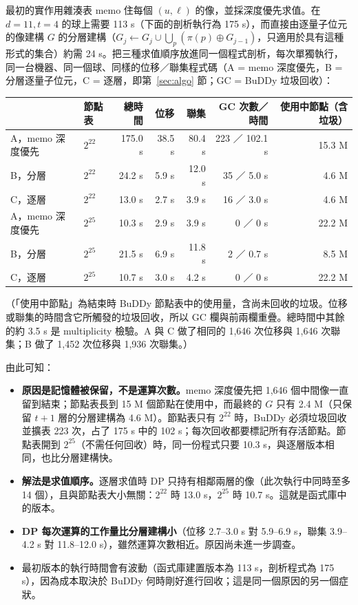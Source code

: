 \documentclass[a4paper,11pt,fontset=none]{ctexart}
\theoremstyle{definition}
\begin{document}
最初的實作用雜湊表 memo 住每個 $(u,\ell)$ 的像，並採深度優先求值。在 $d{=}11,t{=}4$ 的球上需要 113 s（下面的剖析執行為 175 s），而直接由逐量子位元的像建構 $G$ 的分層建構（$G_j\leftarrow G_j\cup\bigcup_p(\pi(p)\oplus G_{j-1})$，只適用於具有這種形式的集合）約需 24 s。把三種求值順序放進同一個程式剖析，每次單獨執行，同一台機器、同一個球、同樣的位移／聯集程式碼（A = memo 深度優先，B = 分層逐量子位元，C = 逐層，即第~\ref{sec:algo} 節；GC = BuDDy 垃圾回收）：
\begin{center}
\small
\begin{tabular}{@{}llrrrrr@{}}
\toprule
 & 節點表 & 總時間 & 位移 & 聯集 & GC 次數／時間 & 使用中節點（含垃圾）\\
\midrule
A，memo 深度優先 & $2^{22}$ & 175.0 s & 38.5 s & 80.4 s & 223 ／ 102.1 s & 15.3 M\\
B，分層 & $2^{22}$ & 24.2 s & 5.9 s & 12.0 s & 35 ／ 5.0 s & 4.6 M\\
C，逐層 & $2^{22}$ & 13.0 s & 2.7 s & 3.9 s & 16 ／ 3.0 s & 4.6 M\\
A，memo 深度優先 & $2^{25}$ & 10.3 s & 2.9 s & 3.9 s & 0 ／ 0 s & 22.2 M\\
B，分層 & $2^{25}$ & 21.5 s & 6.9 s & 11.8 s & 2 ／ 0.7 s & 8.5 M\\
C，逐層 & $2^{25}$ & 10.7 s & 3.0 s & 4.2 s & 0 ／ 0 s & 22.2 M\\
\bottomrule
\end{tabular}
\end{center}
（「使用中節點」為結束時 BuDDy 節點表中的使用量，含尚未回收的垃圾。位移或聯集的時間含它所觸發的垃圾回收，所以 GC 欄與前兩欄重疊。總時間中其餘的約 3.5 s 是 multiplicity 檢驗。A 與 C 做了相同的 1,646 次位移與 1,646 次聯集；B 做了 1,452 次位移與 1,936 次聯集。）

由此可知：
\begin{itemize}[leftmargin=1.5em]
\item \textbf{原因是記憶體被保留，不是運算次數。}memo 深度優先把 1,646 個中間像一直留到結束；節點表長到 15 M 個節點在使用中，而最終的 $G$ 只有 2.4 M（只保留 $t+1$ 層的分層建構為 4.6 M）。節點表只有 $2^{22}$ 時，BuDDy 必須垃圾回收並擴表 223 次，占了 175 s 中的 102 s；每次回收都要標記所有存活節點。節點表開到 $2^{25}$（不需任何回收）時，同一份程式只要 10.3 s，與逐層版本相同，也比分層建構快。
\item \textbf{解法是求值順序。}逐層求值時 DP 只持有相鄰兩層的像（此次執行中同時至多 14 個），且與節點表大小無關：$2^{22}$ 時 13.0 s，$2^{25}$ 時 10.7 s。這就是函式庫中的版本。
\item \textbf{DP 每次運算的工作量比分層建構小}（位移 2.7--3.0 s 對 5.9--6.9 s，聯集 3.9--4.2 s 對 11.8--12.0 s），雖然運算次數相近。原因尚未進一步調查。
\item 最初版本的執行時間會有波動（函式庫建置版本為 113 s，剖析程式為 175 s），因為成本取決於 BuDDy 何時剛好進行回收；這是同一個原因的另一個症狀。
\end{itemize}
\end{document}
